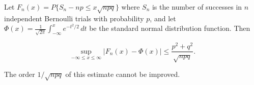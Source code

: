 Let $F_n(x) = P\{S_n - np \leq x\sqrt{npq}\}$ where $S_n$ is the number of successes in $n$ independent Bernoulli trials with probability $p$, and let $\Phi(x) = \frac{1}{\sqrt{2\pi}}\int_{-\infty}^x e^{-t^2/2}\,dt$ be the standard normal distribution function. Then

$$\sup_{-\infty \leq x \leq \infty} |F_n(x) - \Phi(x)| \leq \frac{p^2 + q^2}{\sqrt{npq}}.$$

The order $1/\sqrt{npq}$ of this estimate cannot be improved.
